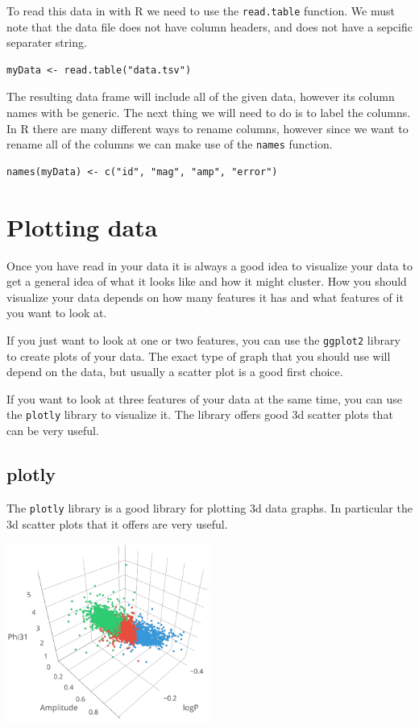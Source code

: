 To read this data in with R we need to use the \verb|read.table| function. We must note that the data file does not have column headers, and does not have a sepcific separater string.

\begin{verbatim}
myData <- read.table("data.tsv")
\end{verbatim}

The resulting data frame will include all of the given data, however its column names with be generic. The next thing we will need to do is to label the columns. In R there are many different ways to rename columns, however since we want to rename all of the columns we can make use of the \verb|names| function.

\begin{verbatim}
names(myData) <- c("id", "mag", "amp", "error")
\end{verbatim}

\section{Plotting data}
Once you have read in your data it is always a good idea to visualize your data to get a general idea of what it looks like and how it might cluster. How you should visualize your data depends on how many features it has and what features of it you want to look at.

If you just want to look at one or two features, you can use the \verb|ggplot2| library to create plots of your data. The exact type of graph that you should use will depend on the data, but usually a scatter plot is a good first choice.

If you want to look at three features of your data at the same time, you can use the \verb|plotly| library to visualize it. The library offers good 3d scatter plots that can be very useful.

\subsection{plotly}
The \verb|plotly| library is a good library for plotting 3d data graphs. In particular the 3d scatter plots that it offers are very useful.

\begin{center}
	\includegraphics[width=0.5\textwidth]{images/kmeans_01.png}
\end{center}

